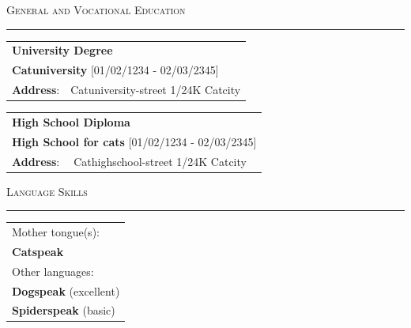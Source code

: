 \documentclass[
	fontsize = 10.0pt,
	a4paper,
	parskip = half*,
	twoside,	%
]{scrartcl}
\renewcommand{\arraystretch}{1.5}			%
\newcommand{\hlinewidth}{0.5mm}
\newcommand{\hlinelength}{150mm}
\newcommand{\hlinecolor}{black!25}
\newcommand{\hlinevskip}{-4.0mm}
\begin{document}
	\vspace{5mm}

	{\fontsize{20pt}{17pt}\selectfont\scshape General and Vocational Education}
	\renewcommand{\arraystretch}{1.25}			%
	\vskip \hlinevskip%
	\textcolor{\hlinecolor}{\rule{\hlinelength}{\hlinewidth}}

	\begin{table}[H]
		\begin{tabularx}{\textwidth}{l X}
			\multicolumn{2}{l}{{\fontsize{14pt}{10pt}\selectfont\bfseries University Degree}}	\\
			\multicolumn{2}{l}{{\fontsize{10pt}{10pt}\selectfont\bfseries Catuniversity} [01/02/1234 - 02/03/2345]}	\\
			{\fontsize{10pt}{10pt}\selectfont\bfseries Address}: &	Catuniversity-street 1/24K Catcity	\\
		\end{tabularx}
	\end{table}

	\begin{table}[H]
		\begin{tabularx}{\textwidth}{l X}
			\multicolumn{2}{l}{{\fontsize{14pt}{10pt}\selectfont\bfseries High School Diploma}}	\\
			\multicolumn{2}{l}{{\fontsize{10pt}{10pt}\selectfont\bfseries High School for cats} [01/02/1234 - 02/03/2345]}	\\
			{\fontsize{10pt}{10pt}\selectfont\bfseries Address}: &	Cathighschool-street 1/24K Catcity	\\
		\end{tabularx}
	\end{table}

	\vspace{5mm}

	{\fontsize{20pt}{17pt}\selectfont\scshape Language Skills}
	\vskip \hlinevskip%
	\textcolor{\hlinecolor}{\rule{\hlinelength}{\hlinewidth}}

	\renewcommand{\arraystretch}{1.35}			%
	\begin{table}[H]
		\begin{tabular}{ l}
			Mother tongue(s):					\\
			\textbf{Catspeak}					\\
			Other languages:					\\
			\textbf{Dogspeak} (excellent)		\\
			\textbf{Spiderspeak} (basic)		\\
		\end{tabular}
	\end{table}%
\end{document}
